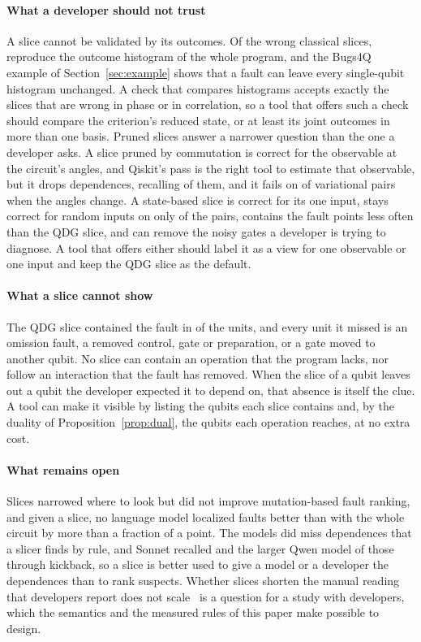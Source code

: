 \paragraph*{What a developer should not trust}
A slice cannot be validated by its outcomes. Of the wrong classical slices, \numFdCpdgZMatchPct{} reproduce the
outcome histogram of the whole program, and the Bugs4Q example of Section~\ref{sec:example} shows that a fault can
leave every single-qubit histogram unchanged. A check that compares histograms accepts exactly the slices that are
wrong in phase or in correlation, so a tool that offers such a check should compare the criterion's reduced state, or
at least its joint outcomes in more than one basis. Pruned slices answer a narrower question than the one a developer
asks. A slice pruned by commutation is correct for the observable at the circuit's angles, and Qiskit's pass is the
right tool to estimate that observable, but it drops dependences, recalling \numLcqRecall{} of them, and it fails
on \numRobLcqParamFail{} of \numRobLcqParamN{} variational pairs when the angles change. A state-based slice is correct for its one input, stays correct for random inputs on only
\numHThreeRate{} of the pairs, contains the fault \numHFourDiffAbs{} points less often than the QDG slice, and can
remove the noisy gates a developer is trying to diagnose. A tool that offers either should label it as a view for one
observable or one input and keep the QDG slice as the default.

\paragraph*{What a slice cannot show}
The QDG slice contained the fault in \numRqThreeContainLc{} of the units, and every unit it missed is an omission
fault, a removed control, gate or preparation, or a gate moved to another qubit. No slice can contain an operation
that the program lacks, nor follow an interaction that the fault has removed. When the slice of a qubit leaves out a qubit the developer expected it to depend on, that absence is itself
the clue. A tool can make it visible by listing the qubits each slice contains and, by the duality of
Proposition~\ref{prop:dual}, the qubits each operation reaches, at no extra cost.

\paragraph*{What remains open}
Slices narrowed where to look but did not improve mutation-based fault ranking, and given a slice, no language model
localized faults better than with the whole circuit by more than a fraction of a point. The models did miss
dependences that a slicer finds by rule, and Sonnet recalled \numTOneSonnetKick{} and the larger Qwen model
\numTOneQwenMidKick{} of those through kickback, so a slice is better used to give a model or a developer the dependences
than to rank suspects. Whether slices shorten the manual reading that developers report does not
scale~\cite{zappin2026challenges} is a question for a study with developers, which the semantics and the measured
rules of this paper make possible to design.
